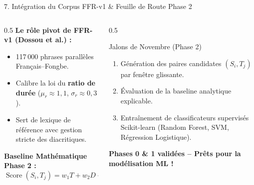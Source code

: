 \documentclass[aspectratio=169,10pt]{beamer}
\begin{document}
\begin{frame}{7. Intégration du Corpus FFR-v1 \& Feuille de Route Phase 2}
\begin{columns}[T]
    \begin{column}{0.5\textwidth}
        \textbf{Le rôle pivot de FFR-v1 (Dossou et al.) :}
        \begin{itemize}
            \item 117\,000 phrases parallèles Français--Fongbe.
            \item Calibre la loi du \textbf{ratio de durée} ($\mu_r \approx 1{,}1$, $\sigma_r \approx 0{,}3$).
            \item Sert de lexique de référence avec gestion stricte des diacritiques.
        \end{itemize}
        \vspace{0.1cm}
        \textbf{Baseline Mathématique Phase 2 :}
        $$\operatorname{Score}(S_i, T_j) = w_1 T + w_2 D + w_3 P + w_4 A$$
    \end{column}
    \begin{column}{0.5\textwidth}
        \begin{block}{Jalons de Novembre (Phase 2)}
            \begin{enumerate}
                \item Génération des paires candidates $(S_i, T_j)$ par fenêtre glissante.
                \item Évaluation de la baseline analytique explicable.
                \item Entraînement de classificateurs supervisés Scikit-learn (Random Forest, SVM, Régression Logistique).
            \end{enumerate}
        \end{block}
        \vspace{0.2cm}
        \centering
        \textbf{\color{amablue}Phases 0 \& 1 validées -- Prêts pour la modélisation ML !}
    \end{column}
\end{columns}
\end{frame}
\end{document}
